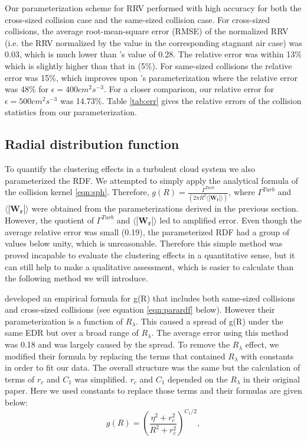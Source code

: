 Our parameterization scheme for RRV performed with high accuracy for both the cross-sized collision case and the same-sized collision case. For cross-sized collisions, the average root-mean-square error (RMSE) of the normalized RRV (i.e. the RRV normalized by the value in the corresponding stagnant air case) was 0.03, which is much lower than \citet{Franklin2007}'s value of 0.28. The relative error was within 13\% which is slightly higher than that in \citet{Ayala2008b} (5\%). For same-sized collisions the relative error was 15\%, which improves upon \citet{Ayala2008b}'s parameterization where the relative error was 48\% for $\epsilon = 400 cm^2s^{-3}$. For a closer comparison, our relative error for $\epsilon = 500 cm^2s^{-3}$ was 14.73\%. Table \ref{tab:err} gives the relative errors of the collision statistics from our parameterization.

\subsection{Radial distribution function}
To quantify the clustering effects in a turbulent cloud system we also parameterized the RDF. We attempted to simply apply the analytical formula of the collision kernel \eqref{eqn:sph}. Therefore, $g(R)= \frac{\Gamma^{Turb}}{(2\pi R^2 \langle |\mathbf{W_r}| \rangle )}$, where $\Gamma^{Turb}$ and $\langle |\mathbf{W_r}| \rangle$ were obtained from the parameterizations derived in the previous section. However, the quotient of $\Gamma^{Turb}$ and $\langle |\mathbf{W_r}| \rangle$ led to amplified error. Even though the average relative error was small (0.19), the parameterized RDF had a group of values below unity, which is unreasonable. Therefore this simple method was proved incapable to evaluate the clustering effects in a quantitative sense, but it can still help to make a qualitative assessment, which is easier to calculate than the following method we will introduce. 

\citet{Ayala2008b} developed an empirical formula for g(R) that includes both same-sized collisions and cross-sized collisions (see equation \eqref{eqn:parardf}  below). However their parameterization is a function of $R_\lambda$. This caused a spread of g(R) under the same EDR but over a broad range of $R_\lambda$. The average error using this method was 0.18 and was largely caused by the spread. To remove the $R_\lambda$ effect, we modified their formula by replacing the terms that contained $R_\lambda$ with constants in order to fit our data. The overall structure was the same but the calculation of terms of $r_c$ and $C_1$ was simplified. $r_c$ and $C_1$ depended on the $R_\lambda$ in their original paper. Here we used constants to replace those terms and their formulas are given below: 
\begin{equation}
g(R)=(\frac{\eta^2+r_c^2}{R^2+r_c^2})^{C_1/2}, 
 \label{eqn:parardf}
\end{equation}

